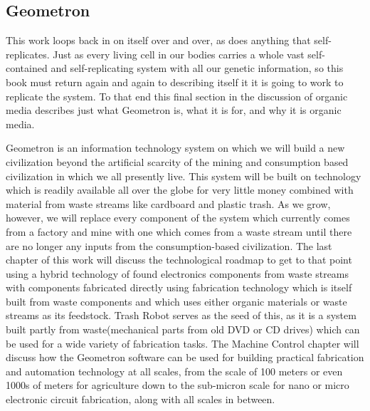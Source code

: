 \subsection{Geometron}

This work loops back in on itself over and over, as does anything that self-replicates.  Just as every living cell in our bodies carries a whole vast self-contained and self-replicating system with all our genetic information, so this book must return again and again to describing itself it it is going to work to replicate the system.  To that end this final section in the discussion of organic media describes just what Geometron is, what it is for, and why it is organic media.

Geometron is an information technology system on which we will build a new civilization beyond the artificial scarcity of the mining and consumption based civilization in which we all presently live.  This system will be built on technology which is readily available all over the globe for very little money combined with material from waste streams like cardboard and plastic trash. As we grow, however, we will replace every component of the system which currently comes from a factory and mine with one which comes from a waste stream until there are no longer any inputs from the consumption-based civilization.  The last chapter of this work will discuss the technological roadmap to get to that point using a hybrid technology of found electronics components from waste streams with components fabricated directly using fabrication technology which is itself built from waste components and which uses either organic materials or waste streams as its feedstock.  Trash Robot serves as the seed of this, as it is a system built partly from waste(mechanical parts from old DVD or CD drives) which can be used for a wide variety of fabrication tasks.  The Machine Control chapter will discuss how the Geometron software can be used for building practical fabrication and automation technology at all scales, from the scale of 100 meters or even 1000s of meters for agriculture down to the sub-micron scale for nano or micro electronic circuit fabrication, along with all scales in between.  


